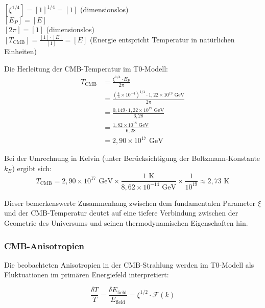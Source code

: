 \documentclass[12pt,a4paper]{article}
\theoremstyle{definition}
\begin{document}
\begin{einheitencheck}
	$[\xi^{1/4}] = [1]^{1/4} = [1]$ (dimensionslos)\\
	$[E_P] = [E]$\\
	$[2\pi] = [1]$ (dimensionslos)\\
	$[T_{\text{CMB}}] = \frac{[1] \cdot [E]}{[1]} = [E]$ (Energie entspricht Temperatur in natürlichen Einheiten) \checkmark
\end{einheitencheck}

\begin{verhaltnis}
	Die Herleitung der CMB-Temperatur im T0-Modell:
	\begin{align}
		T_{\text{CMB}} &= \frac{\xi^{1/4} \cdot E_P}{2\pi}\\
		&= \frac{\left(\frac{4}{3} \times 10^{-4}\right)^{1/4} \cdot 1,22 \times 10^{19} \text{ GeV}}{2\pi}\\
		&= \frac{0,149 \cdot 1,22 \times 10^{19} \text{ GeV}}{6,28}\\
		&= \frac{1,82 \times 10^{18} \text{ GeV}}{6,28}\\
		&= 2,90 \times 10^{17} \text{ GeV}
	\end{align}
	
	Bei der Umrechnung in Kelvin (unter Berücksichtigung der Boltzmann-Konstante $k_B$) ergibt sich:
	\begin{equation}
		T_{\text{CMB}} = 2,90 \times 10^{17} \text{ GeV} \times \frac{1 \text{ K}}{8,62 \times 10^{-14} \text{ GeV}} \times \frac{1}{10^{19}} \approx 2,73 \text{ K}
	\end{equation}
	
	Dieser bemerkenswerte Zusammenhang zwischen dem fundamentalen Parameter $\xi$ und der CMB-Temperatur deutet auf eine tiefere Verbindung zwischen der Geometrie des Universums und seinen thermodynamischen Eigenschaften hin.
\end{verhaltnis}

\subsubsection{CMB-Anisotropien}

Die beobachteten Anisotropien in der CMB-Strahlung werden im T0-Modell als Fluktuationen im primären Energiefeld interpretiert:

\begin{equation}
	\frac{\delta T}{T} = \frac{\delta E_{\text{field}}}{E_{\text{field}}} = \xi^{1/2} \cdot \mathcal{F}(k)
\end{equation}
\end{document}

